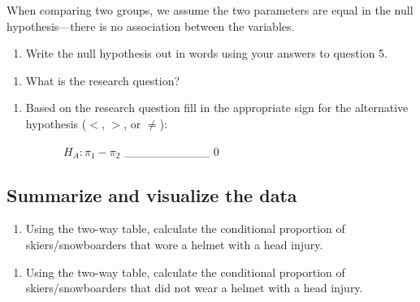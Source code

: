 \documentclass[
]{report}
\providecommand{\tightlist}{%
  \setlength{\itemsep}{0pt}\setlength{\parskip}{0pt}}
\begin{document}
When comparing two groups, we assume the two parameters are equal in the null hypothesis---there is no association between the variables.

\begin{enumerate}
\def\labelenumi{\arabic{enumi}.}
\setcounter{enumi}{5}
\tightlist
\item
  Write the null hypothesis out in words using your answers to question 5.
\end{enumerate}

\vspace{0.81in}

\begin{enumerate}
\def\labelenumi{\arabic{enumi}.}
\setcounter{enumi}{6}
\tightlist
\item
  What is the research question?
\end{enumerate}

\vspace{0.5in}

\begin{enumerate}
\def\labelenumi{\arabic{enumi}.}
\setcounter{enumi}{7}
\tightlist
\item
  Based on the research question fill in the appropriate sign for the alternative hypothesis (\(<\), \(>\), or \(\neq\)):
  \vspace{0.25in}
\end{enumerate}

~~~~~~~~~~\(H_A: \pi_1 -\pi_2\) \_\_\_\_\_\_\_\_\_\_ 0

\newpage

\hypertarget{summarize-and-visualize-the-data}{%
\subsection*{Summarize and visualize the data}\label{summarize-and-visualize-the-data}}

\begin{enumerate}
\def\labelenumi{\arabic{enumi}.}
\setcounter{enumi}{8}
\tightlist
\item
  Using the two-way table, calculate the conditional proportion of skiers/snowboarders that wore a helmet with a head injury.
\end{enumerate}

\vspace{.3in}

\begin{enumerate}
\def\labelenumi{\arabic{enumi}.}
\setcounter{enumi}{9}
\tightlist
\item
  Using the two-way table, calculate the conditional proportion of skiers/snowboarders that did not wear a helmet with a head injury.
\end{enumerate}
\end{document}
